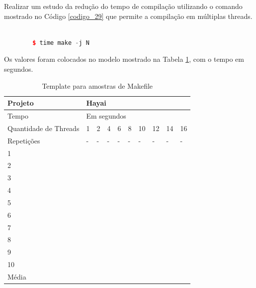 Realizar um estudo da redução do tempo de compilação utilizando o comando
 mostrado no Código \ref{codigo_29} que permite a compilação em
 múltiplas threads.


\begin{lstlisting}[language=C++,frame=single,captionpos=b,caption={Execução programa 
								time mais programa make executando com threads},
                                                  			 label=codigo_29]

        $ time make -j N
\end{lstlisting}

Os valores foram colocados no modelo mostrado na Tabela \ref{tab:makefile},
 com o tempo em segundos.

\begin{table}[h]
\centering
\begin{tabular}{|p{1cm}|p{1.4cm}|p{1.4cm}|p{1.4cm}|p{1.4cm}|p{1.4cm}|p{1.4cm}|p{1.4cm}|p{1.4cm}|p{1.4cm}|}
\hline
Projeto               & \multicolumn{9}{l|}{Hayai}        \\ \hline
Tempo                 & \multicolumn{9}{l|}{Em segundos}      \\ \hline
Quantidade de Threads & 1 & 2 & 4 & 6 & 8 & 10 & 12 & 14 & 16 \\ \hline
Repetições            & - & - & - & - & - & -  & -  & -  & -  \\ \hline
1 &  &  &  &  &  &  &  &  &  \\ \hline
2 &  &  &  &  &  &  &  &  &  \\ \hline
3 &  &  &  &  &  &  &  &  &  \\ \hline
4 &  &  &  &  &  &  &  &  &  \\ \hline
5 &  &  &  &  &  &  &  &  &  \\ \hline
6 &  &  &  &  &  &  &  &  &  \\ \hline
7 &  &  &  &  &  &  &  &  &  \\ \hline
8 &  &  &  &  &  &  &  &  &  \\ \hline
9 &  &  &  &  &  &  &  &  &  \\ \hline
10 &  &  &  &  &  &  &  &  &  \\ \hline
Média &  &  &  &  &  &  &  &  &  \\ \hline
\end{tabular}
\caption{Template para amostras de Makefile}
\label{tab:makefile}
\end{table}


